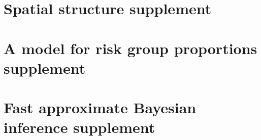 \documentclass[a4paper, nobind]{templates/ociamthesis}
\newcommand*{\bibtitle}{Works Cited}
\begin{document}
\startappendices

\hypertarget{spatial-structure-supplement}{%
\chapter{Spatial structure supplement}\label{spatial-structure-supplement}}

\hypertarget{a-model-for-risk-group-proportions-supplement}{%
\chapter{A model for risk group proportions supplement}\label{a-model-for-risk-group-proportions-supplement}}

\hypertarget{fast-approximate-bayesian-inference-supplement}{%
\chapter{Fast approximate Bayesian inference supplement}\label{fast-approximate-bayesian-inference-supplement}}




\setlength{\baselineskip}{0pt} %

{\renewcommand*\MakeUppercase[1]{#1}%
\printbibliography[heading=bibintoc,title={\bibtitle}]}
\end{document}
